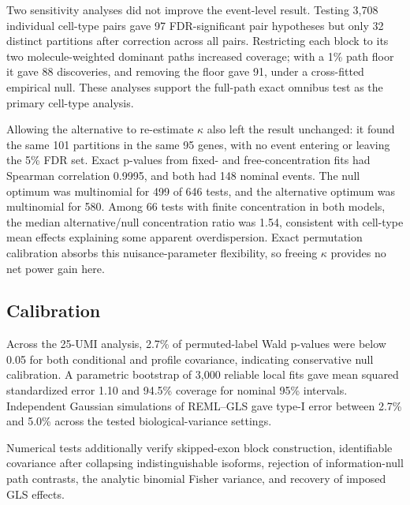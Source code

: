\documentclass[11pt]{article}
\begin{document}
Two sensitivity analyses did not improve the event-level result. Testing 3,708 individual cell-type pairs gave 97 FDR-significant pair hypotheses but only 32 distinct partitions after correction across all pairs. Restricting each block to its two molecule-weighted dominant paths increased coverage; with a 1\% path floor it gave 88 discoveries, and removing the floor gave 91, under a cross-fitted empirical null. These analyses support the full-path exact omnibus test as the primary cell-type analysis.

Allowing the alternative to re-estimate \(\kappa\) also left the result unchanged: it found the same 101 partitions in the same 95 genes, with no event entering or leaving the 5\% FDR set. Exact p-values from fixed- and free-concentration fits had Spearman correlation 0.9995, and both had 148 nominal events. The null optimum was multinomial for 499 of 646 tests, and the alternative optimum was multinomial for 580. Among 66 tests with finite concentration in both models, the median alternative/null concentration ratio was 1.54, consistent with cell-type mean effects explaining some apparent overdispersion. Exact permutation calibration absorbs this nuisance-parameter flexibility, so freeing \(\kappa\) provides no net power gain here.

\subsection*{Calibration}

Across the 25-UMI analysis, 2.7\% of permuted-label Wald p-values were below 0.05 for both conditional and profile covariance, indicating conservative null calibration. A parametric bootstrap of 3,000 reliable local fits gave mean squared standardized error 1.10 and 94.5\% coverage for nominal 95\% intervals. Independent Gaussian simulations of REML--GLS gave type-I error between 2.7\% and 5.0\% across the tested biological-variance settings.

Numerical tests additionally verify skipped-exon block construction, identifiable covariance after collapsing indistinguishable isoforms, rejection of information-null path contrasts, the analytic binomial Fisher variance, and recovery of imposed GLS effects.
\end{document}
